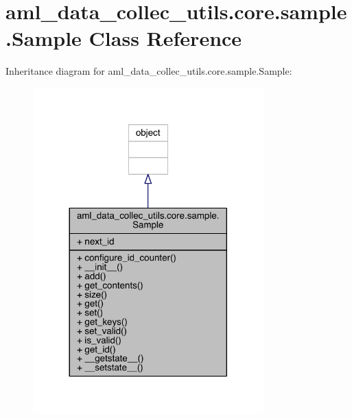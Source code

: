 \hypertarget{classaml__data__collec__utils_1_1core_1_1sample_1_1_sample}{}\section{aml\+\_\+data\+\_\+collec\+\_\+utils.\+core.\+sample.\+Sample Class Reference}
\label{classaml__data__collec__utils_1_1core_1_1sample_1_1_sample}


Inheritance diagram for aml\+\_\+data\+\_\+collec\+\_\+utils.\+core.\+sample.\+Sample\+:
\nopagebreak
\begin{figure}[H]
\begin{center}
\leavevmode
\includegraphics[width=252pt]{classaml__data__collec__utils_1_1core_1_1sample_1_1_sample__inherit__graph}
\end{center}
\end{figure}


